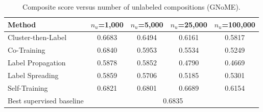 \begin{table}[H]
\centering\small
\begin{tabular}{lcccc}
\toprule
Method & $n_u$=1,000 & $n_u$=5,000 & $n_u$=25,000 & $n_u$=100,000\\
\midrule
Cluster-then-Label & 0.6683 & 0.6494 & 0.6161 & 0.5817 \\
Co-Training & 0.6840 & 0.5953 & 0.5534 & 0.5249 \\
Label Propagation & 0.5878 & 0.5852 & 0.4790 & 0.4669 \\
Label Spreading & 0.5859 & 0.5706 & 0.5185 & 0.5301 \\
Self-Training & 0.6821 & 0.6801 & 0.6689 & 0.6154 \\
\midrule
Best supervised baseline & \multicolumn{4}{c}{0.6835}\\
\bottomrule
\end{tabular}
\caption*{Composite score versus number of unlabeled compositions (GNoME).}
\end{table}

